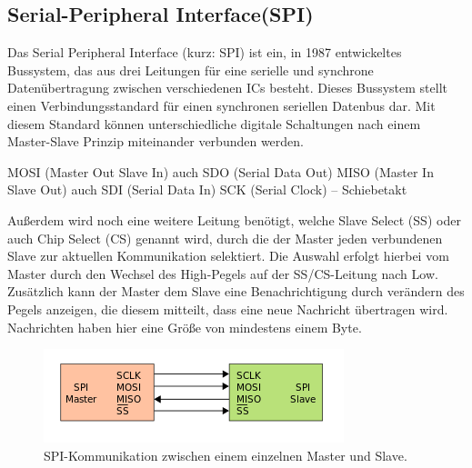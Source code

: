 \subsection{Serial-Peripheral Interface(SPI)} \label{grund-spi-subsubsec}


Das Serial Peripheral Interface (kurz: SPI) ist ein, in 1987 entwickeltes Bussystem, das aus drei Leitungen für eine serielle und synchrone Datenübertragung zwischen verschiedenen ICs besteht. Dieses Bussystem stellt einen Verbindungsstandard für einen synchronen seriellen Datenbus dar. Mit diesem Standard können unterschiedliche digitale Schaltungen nach einem Master-Slave Prinzip miteinander verbunden werden.

 MOSI (Master Out  Slave In) auch SDO (Serial Data Out)
 MISO (Master In   Slave Out) auch SDI (Serial Data In)
 SCK (Serial Clock) – Schiebetakt

Außerdem wird noch eine weitere Leitung benötigt, welche Slave Select (SS) oder auch
Chip Select (CS) genannt wird, durch die der Master jeden verbundenen Slave zur aktuellen
Kommunikation selektiert. Die Auswahl erfolgt hierbei vom Master durch den Wechsel des
High-Pegels auf der SS/CS-Leitung nach Low. Zusätzlich kann der Master dem Slave eine
Benachrichtigung durch verändern des Pegels anzeigen, die diesem mitteilt, dass eine neue
Nachricht übertragen wird. Nachrichten haben hier eine Größe von mindestens einem Byte.

\begin{figure}[H] \centering
\includegraphics[width=\textwidth]{Images/SPI_single_slave.png} 
\vspace{-0.3cm} 
\caption{ SPI-Kommunikation zwischen einem einzelnen Master und Slave.}
\label{fig-elise} 
\end{figure}

